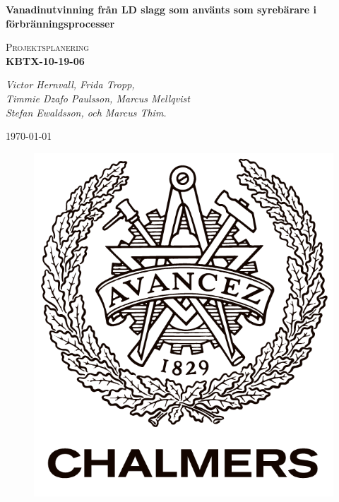 \documentclass{article}
\begin{document}
\begin{titlepage}
\begin{centering}

{\huge\bfseries Vanadinutvinning från LD slagg som använts som syrebärare i förbränningsprocesser \par}
\vspace{1cm}
{\scshape\Large Projektsplanering \\ \textbf{KBTX-10-19-06}\par}
{\scshape\Large \par}
{\Large\itshape Victor Hernvall, Frida Tropp,  \\ Timmie Dzafo Paulsson, Marcus Mellqvist \\ Stefan Ewaldsson, och Marcus Thim.\par}
{\large \today\par}

{   \par}
{   \par}
{    \par}


\begin{figure}[!ht]
\centering
\includegraphics[scale=0.3]{chalmers.png}
\label{fig:chalmers}

\end{figure}


\end{centering}
\end{titlepage}
\end{document}
